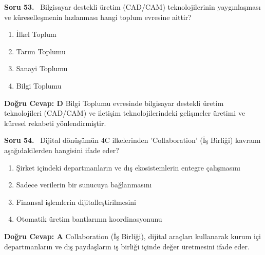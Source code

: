 \documentclass[11pt,a4paper,openany]{book}
\begin{document}
\needspace{5cm}
\vspace{8pt}
\noindent\textbf{\large\sffamily Soru 53.} \ Bilgisayar destekli üretim (CAD/CAM) teknolojilerinin yaygınlaşması ve küreselleşmenin hızlanması hangi toplum evresine aittir?
\begin{enumerate}[label=\Alph*), leftmargin=25pt, topsep=4pt, itemsep=2pt]
    \item İlkel Toplum
    \item Tarım Toplumu
    \item Sanayi Toplumu
    \item Bilgi Toplumu
\end{enumerate}
\vspace{4pt}
\begin{tcolorbox}[title=Cevap ve Açıklama, colback=gray!3!white, colframe=primarycolor!90!black, arc=2mm, fonttitle=\bfseries\sffamily, top=6pt, bottom=6pt]
    \textbf{Doğru Cevap: D}
    \vspace{2pt}
    Bilgi Toplumu evresinde bilgisayar destekli üretim teknolojileri (CAD/CAM) ve iletişim teknolojilerindeki gelişmeler üretimi ve küresel rekabeti yönlendirmiştir.
\end{tcolorbox}
\vspace{10pt}

\needspace{5cm}
\vspace{8pt}
\noindent\textbf{\large\sffamily Soru 54.} \ Dijital dönüşümün 4C ilkelerinden 'Collaboration' (İş Birliği) kavramı aşağıdakilerden hangisini ifade eder?
\begin{enumerate}[label=\Alph*), leftmargin=25pt, topsep=4pt, itemsep=2pt]
    \item Şirket içindeki departmanların ve dış ekosistemlerin entegre çalışmasını
    \item Sadece verilerin bir sunucuya bağlanmasını
    \item Finansal işlemlerin dijitalleştirilmesini
    \item Otomatik üretim bantlarının koordinasyonunu
\end{enumerate}
\vspace{4pt}
\begin{tcolorbox}[title=Cevap ve Açıklama, colback=gray!3!white, colframe=primarycolor!90!black, arc=2mm, fonttitle=\bfseries\sffamily, top=6pt, bottom=6pt]
    \textbf{Doğru Cevap: A}
    \vspace{2pt}
    Collaboration (İş Birliği), dijital araçları kullanarak kurum içi departmanların ve dış paydaşların iş birliği içinde değer üretmesini ifade eder.
\end{tcolorbox}
\vspace{10pt}
\end{document}

